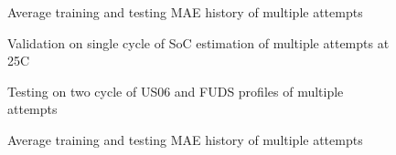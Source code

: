 \begin{figure*}[htbp]
    \centering
    \begin{subfigure}[b]{0.325\textwidth}
        \centering
        
        \caption{Average training and testing MAE history of multiple attempts}
    \end{subfigure}
    \hfill
    \begin{subfigure}[b]{0.325\textwidth}
        \centering
        
        \caption{Validation on single cycle of SoC estimation of multiple attempts at 25\textdegree{}C}
    \end{subfigure}
    \hfill
    \begin{subfigure}[b]{0.325\textwidth}
        \centering
        
        \caption{Testing on two cycle of US06 and FUDS profiles of multiple attempts}
        \label{subfig:Model-4res-DSTvsFUDS}
    \end{subfigure}
    \begin{subfigure}[b]{0.325\textwidth}
        \centering
        
        \caption{Average training and testing MAE history of multiple attempts}

\end{subfigure}
\end{figure*}
